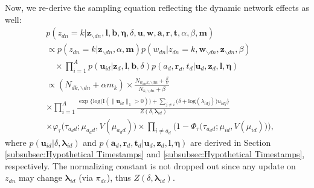 \documentclass[twoside]{article}
\begin{document}
  	  Now, we re-derive the sampling equation reflecting the dynamic network effects as well:
  	   \begin{equation*}
  	   \begin{aligned}
  	   &p(z_{dn}=k | \boldsymbol{z}_{\backslash dn}, \boldsymbol{l}, \boldsymbol{b},\boldsymbol{\eta}, \delta, \boldsymbol{u}, \boldsymbol{w}, \boldsymbol{a}, \boldsymbol{r}, \boldsymbol{t}, \alpha, \beta, \boldsymbol{m})\\&\propto
  	   p(z_{dn}=k| \boldsymbol{z}_{\backslash dn}, \alpha, \boldsymbol{m}) p(w_{dn}| z_{dn}=k,\boldsymbol{w}_{\backslash dn}, \boldsymbol{z}_{\backslash dn},\beta) \\&\quad\times\prod_{i=1}^A  p(\boldsymbol{u}_{id}|\boldsymbol{z}_d, \boldsymbol{l}, \boldsymbol{b}, \delta)p({a}_d, \boldsymbol{r}_d, {t}_d|\boldsymbol{u}_d,\boldsymbol{z}_d, \boldsymbol{l}, \boldsymbol{\eta} )\\&\propto
  	   ({N_{dk, \backslash dn}+\alpha m_k})\times 	  \frac{N_{w_{dn}k, \backslash dn}+\frac{\beta}{V}}{N_{k, \backslash dn}+\beta}
  	   \\&  \times\prod_{i=1}^A \frac{\exp\Big\{\mbox{log}\Big(\text{I}( \lVert \boldsymbol{u}_{id}\rVert_1 > 0 )\Big) + \sum\limits_{j \neq i} \Big(\delta+\mbox{log}(\lambda_{idj})\Big)u_{idj}\Big\}}{Z(\delta,\boldsymbol{\lambda}_{id})}
  	   \\& \times\varphi_{\tau}\big(\tau_{a_d d}; \mu_{a_d d}, V(\mu_{a_d d})\big)\times  \prod_{i\neq a_d}\Big(1-\Phi_{\tau} \big(\tau_{a_d d}; \mu_{i d}, V(\mu_{i d})\big) \Big),
  	   \end{aligned}
  	   \end{equation*}
  	   where $p(\boldsymbol{u}_{id}|\delta, \boldsymbol{\lambda}_{id})$ and $p(\boldsymbol{a}_d, \boldsymbol{r}_d, \boldsymbol{t}_d|\boldsymbol{u}_d,\boldsymbol{z}_d, \boldsymbol{l}, \boldsymbol{\eta} )$ are derived in Section \ref{subsubsec:Hypothetical Timestamps} and \ref{subsubsec:Hypothetical Timestamps}, respectively. The normalizing constant is not dropped out since any update on $z_{dn}$ may change $\boldsymbol{\lambda}_{id}$ (via $\pi_{dc}$), thus $Z(\delta,\boldsymbol{\lambda}_{id})$.
  	  
\end{document}
